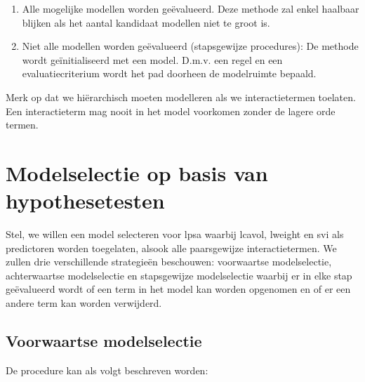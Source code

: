 \documentclass[
  dutch,
  letterpaper,
  12pt]{book}
\theoremstyle{definition}
\theoremstyle{definition}
\theoremstyle{definition}
\theoremstyle{remark}
\begin{document}
\begin{enumerate}
\def\labelenumi{\arabic{enumi}.}
\item
  Alle mogelijke modellen worden geëvalueerd. Deze methode zal enkel
  haalbaar blijken als het aantal kandidaat modellen niet te groot is.
\item
  Niet alle modellen worden geëvalueerd (stapsgewijze procedures): De
  methode wordt geïnitialiseerd met een model. D.m.v. een regel en een
  evaluatiecriterium wordt het pad doorheen de modelruimte bepaald.
\end{enumerate}

Merk op dat we hiërarchisch moeten modelleren als we interactietermen
toelaten. Een interactieterm mag nooit in het model voorkomen zonder de
lagere orde termen.

\section{Modelselectie op basis van
hypothesetesten}\label{modelselectie-op-basis-van-hypothesetesten}

Stel, we willen een model selecteren voor lpsa waarbij lcavol, lweight
en svi als predictoren worden toegelaten, alsook alle paarsgewijze
interactietermen. We zullen drie verschillende strategieën beschouwen:
voorwaartse modelselectie, achterwaartse modelselectie en stapsgewijze
modelselectie waarbij er in elke stap geëvalueerd wordt of een term in
het model kan worden opgenomen en of er een andere term kan worden
verwijderd.

\subsection{Voorwaartse modelselectie}\label{voorwaartse-modelselectie}

De procedure kan als volgt beschreven worden:
\end{document}
